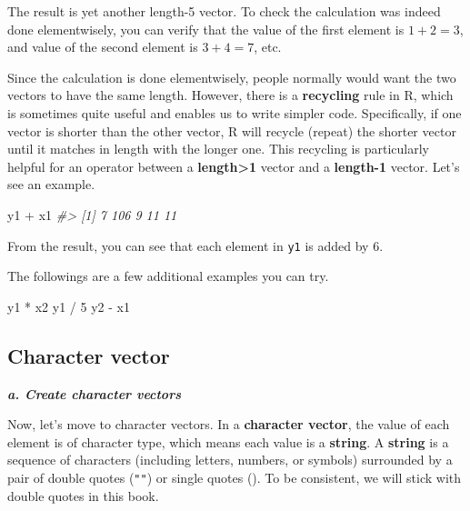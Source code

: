 \documentclass[
]{book}
\newenvironment{Shaded}{\begin{snugshade}}{\end{snugshade}}
\newcommand{\CommentTok}[1]{\textcolor[rgb]{0.56,0.35,0.01}{\textit{#1}}}
\newcommand{\DecValTok}[1]{\textcolor[rgb]{0.00,0.00,0.81}{#1}}
\newcommand{\NormalTok}[1]{#1}
\newcommand{\SpecialCharTok}[1]{\textcolor[rgb]{0.00,0.00,0.00}{#1}}
\begin{document}
The result is yet another length-5 vector. To check the calculation was indeed done elementwisely, you can verify that the value of the first element is \(1 + 2 = 3\), and value of the second element is \(3 + 4 = 7\), etc.

Since the calculation is done elementwisely, people normally would want the two vectors to have the same length. However, there is a \textbf{recycling} rule in R, which is sometimes quite useful and enables us to write simpler code. Specifically, if one vector is shorter than the other vector, R will recycle (repeat) the shorter vector until it matches in length with the longer one. This recycling is particularly helpful for an operator between a \textbf{length\textgreater1} vector and a \textbf{length-1} vector. Let's see an example.

\begin{Shaded}
\begin{Highlighting}[]
\NormalTok{y1 }\SpecialCharTok{+}\NormalTok{ x1}
\CommentTok{\#\textgreater{} [1]   7 106   9  11  11}
\end{Highlighting}
\end{Shaded}

From the result, you can see that each element in \texttt{y1} is added by 6.

The followings are a few additional examples you can try.

\begin{Shaded}
\begin{Highlighting}[]
\NormalTok{y1 }\SpecialCharTok{*}\NormalTok{ x2}
\NormalTok{y1 }\SpecialCharTok{/} \DecValTok{5}
\NormalTok{y2 }\SpecialCharTok{{-}}\NormalTok{ x1}
\end{Highlighting}
\end{Shaded}

\hypertarget{vector-character}{%
\subsection{Character vector}\label{vector-character}}

\textbf{\emph{a. Create character vectors}}

Now, let's move to character vectors. In a \textbf{character vector}, the value of each element is of character type, which means each value is a \textbf{string}. A \textbf{string} is a sequence of characters (including letters, numbers, or symbols) surrounded by a pair of double quotes (\texttt{""}) or single quotes (\texttt{\textquotesingle{}\textquotesingle{}}). To be consistent, we will stick with double quotes in this book.
\end{document}
